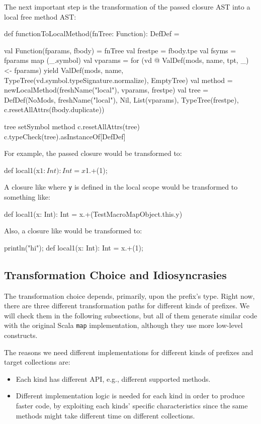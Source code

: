 The next important step is the transformation of the passed closure AST
into a local free method AST:

\begin{scalaCode}
def functionToLocalMethod(fnTree: Function): DefDef = {
  val Function(fparams, fbody) = fnTree
  val frestpe = fbody.tpe
  val fsyms   = fparams map (_.symbol)
  val vparams = for (vd @ ValDef(mods, name, tpt, _) <- fparams) yield ValDef(mods, name, TypeTree(vd.symbol.typeSignature.normalize), EmptyTree)
  val method  = newLocalMethod(freshName("local"), vparams, frestpe)
  val tree    = DefDef(NoMods, freshName("local"), Nil, List(vparams), TypeTree(frestpe), c.resetAllAttrs(fbody.duplicate))

  tree setSymbol method
  c.resetAllAttrs(tree)
  c.typeCheck(tree).asInstanceOf[DefDef]
}
\end{scalaCode}

For example, the passed closure  would be transformed to:
\begin{scalaCode}
def local1(x$1: Int): Int = x$1.+(1);
\end{scalaCode}
A closure like  where \texttt{y} is defined in the local scope would be
transformed to something like:
\begin{scalaCode}
def local1(x: Int): Int = x.+(TestMacroMapObject.this.y)
\end{scalaCode}
Also, a closure like  would be transformed to:
\begin{scalaCode}
println("hi");
def local1(x: Int): Int = x.+(1);
\end{scalaCode}

\subsection{Transformation Choice and Idiosyncrasies}

The transformation choice depends, primarily, upon the prefix's type. Right now,
there are three different transformation paths for different kinds of
prefixes. We will check them in the following subsections, but all of them generate
similar code with the original Scala \texttt{map} implementation, although they use 
more low-level constructs.

The reasons we need different implementations for different kinds of
prefixes and target collections are:

\begin{itemize}
 \item
  Each kind has different API, e.g., different supported methods.
 \item
  Different implementation logic is needed for each kind in order to produce
faster code, by exploiting each kinds' specific characteristics since the same
methods might take different time on different collections.
\end{itemize}

